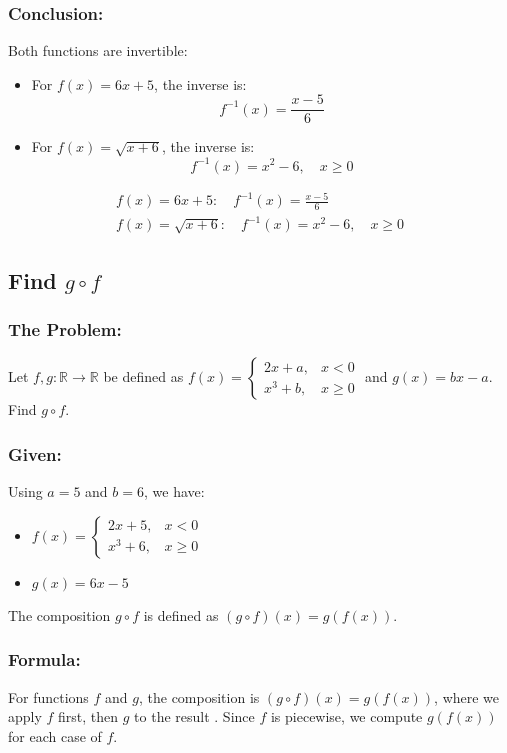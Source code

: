 \documentclass[12pt, a4paper, twoside]{report} %
\begin{document}
\subsubsection*{Conclusion:}
Both functions are invertible:
\begin{itemize}
  \item For \( f(x) = 6x + 5 \), the inverse is:
    \[
    f^{-1}(x) = \frac{x - 5}{6}
    \]
  \item For \( f(x) = \sqrt{x + 6} \), the inverse is:
    \[
    f^{-1}(x) = x^2 - 6, \quad x \geq 0
    \]
\end{itemize}
\[
\boxed{
\begin{array}{l}
f(x) = 6x + 5: \quad f^{-1}(x) = \frac{x - 5}{6} \\
f(x) = \sqrt{x + 6}: \quad f^{-1}(x) = x^2 - 6, \quad x \geq 0
\end{array}
}
\]

\subsection{Find \( g \circ f \)}

\subsubsection*{The Problem:}
Let \( f, g: \mathbb{R} \rightarrow \mathbb{R} \) be defined as \( f(x) = \begin{cases} 2x + a, & x < 0 \\ x^3 + b, & x \geq 0 \end{cases} \) and \( g(x) = bx - a \). Find \( g \circ f \).

\subsubsection*{Given:}
Using \( a = 5 \) and \( b = 6 \), we have:
\begin{itemize}
  \item \( f(x) = \begin{cases} 2x + 5, & x < 0 \\ x^3 + 6, & x \geq 0 \end{cases} \)
  \item \( g(x) = 6x - 5 \)
\end{itemize}
The composition \( g \circ f \) is defined as \( (g \circ f)(x) = g(f(x)) \).

\subsubsection*{Formula:}
For functions \( f \) and \( g \), the composition is \( (g \circ f)(x) = g(f(x)) \), where we apply \( f \) first, then \( g \) to the result \cite{rosen2019}. Since \( f \) is piecewise, we compute \( g(f(x)) \) for each case of \( f \).
\end{document}
